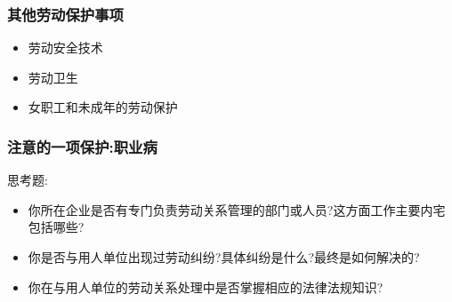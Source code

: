 \documentclass{ctexart}
\begin{document}
\subsubsection{其他劳动保护事项}
\label{sec-3-4-5}
\begin{itemize}
\item 劳动安全技术
\item 劳动卫生
\item 女职工和未成年的劳动保护
\end{itemize}
\subsubsection{注意的一项保护:职业病}
\label{sec-3-4-6}
思考题:
\begin{itemize}
\item 你所在企业是否有专门负责劳动关系管理的部门或人员?这方面工作主要内宅包括哪些?
\item 你是否与用人单位出现过劳动纠纷?具体纠纷是什么?最终是如何解决的?
\item 你在与用人单位的劳动关系处理中是否掌握相应的法律法规知识?
\end{itemize}
\end{document}
